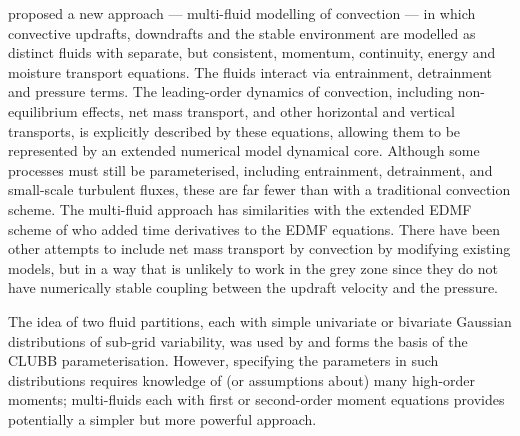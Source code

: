 \documentclass[11pt,a4paper]{article}
\begin{document}
\cite{TWV+18} proposed a new approach --- multi-fluid modelling of convection --- in which convective updrafts, downdrafts and the stable environment are modelled as distinct fluids with separate, but consistent, momentum, continuity, energy and moisture transport equations. The fluids interact via entrainment, detrainment and pressure terms. 
The leading-order dynamics of convection, including non-equilibrium effects, net mass transport, and other horizontal and vertical transports, is explicitly described by these equations, allowing them to be represented by
an extended numerical model dynamical core. Although some processes must still be parameterised, including entrainment,
detrainment, and small-scale turbulent fluxes, these are far fewer than with a traditional convection scheme.
The multi-fluid approach has similarities with the extended EDMF scheme of \cite{TKP+18} who added time derivatives to the EDMF equations.
{\color{red} There have been other attempts to include net mass transport by convection \cite[]{KB08,MB19} by modifying existing models, but in a way that is unlikely to work in the grey zone since they do not have numerically stable coupling between the updraft velocity and the pressure.}

{\color{red} The idea of two fluid partitions, each with simple univariate or bivariate Gaussian distributions of sub-grid variability, was used by \cite{GLC02} and forms the basis of the CLUBB parameterisation. However, specifying the parameters in such distributions requires knowledge of (or assumptions about) many high-order moments; multi-fluids each with first or second-order moment equations provides potentially a simpler but more powerful approach.}


\end{document}
